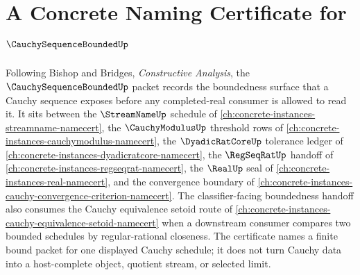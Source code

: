 \chapter{A Concrete Naming Certificate for $\CauchySequenceBoundedUp$}
\label{ch:concrete-instances-cauchy-sequence-bounded-namecert}

Following Bishop and Bridges, \emph{Constructive Analysis}, the $\CauchySequenceBoundedUp$ packet records the boundedness surface that a Cauchy sequence exposes before any completed-real consumer is allowed to read it. It sits between the $\StreamNameUp$ schedule of \autoref{ch:concrete-instances-streamname-namecert}, the $\CauchyModulusUp$ threshold rows of \autoref{ch:concrete-instances-cauchymodulus-namecert}, the $\DyadicRatCoreUp$ tolerance ledger of \autoref{ch:concrete-instances-dyadicratcore-namecert}, the $\RegSeqRatUp$ handoff of \autoref{ch:concrete-instances-regseqrat-namecert}, the $\RealUp$ seal of \autoref{ch:concrete-instances-real-namecert}, and the convergence boundary of \autoref{ch:concrete-instances-cauchy-convergence-criterion-namecert}. The classifier-facing boundedness handoff also consumes the Cauchy equivalence setoid route of \autoref{ch:concrete-instances-cauchy-equivalence-setoid-namecert} when a downstream consumer compares two bounded schedules by regular-rational closeness. The certificate names a finite bound packet for one displayed Cauchy schedule; it does not turn Cauchy data into a host-complete object, quotient stream, or selected limit.

